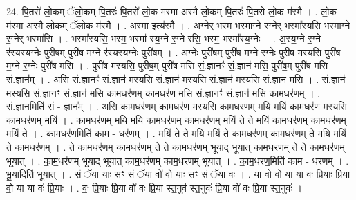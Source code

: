 \documentclass[17pt]{extarticle}
\begin{document}
24. पि॒तरो॑ लो॒कम् ॅलो॒कम् पि॒तरः॑ पि॒तरो॑ लो॒क म॑स्मा अस्मै लो॒कम् पि॒तरः॑ पि॒तरो॑ लो॒क म॑स्मै । . लो॒क म॑स्मा अस्मै लो॒कम् ॅलो॒क म॑स्मै । . अ॒स्मा॒ इत्य॑स्मै । . अ॒ग्नेर् भस्म॒ भस्मा॒ग्ने र॒ग्नेर् भस्मा᳚स्यसि॒ भस्मा॒ग्ने र॒ग्नेर् भस्मा॑सि । . भस्मा᳚स्यसि॒ भस्म॒ भस्मा᳚ स्य॒ग्ने र॒ग्ने र॑सि॒ भस्म॒ भस्मा᳚स्य॒ग्नेः । . अ॒स्य॒ग्ने र॒ग्ने र॑स्यस्य॒ग्नेः पुरी॑ष॒म् पुरी॑ष म॒ग्ने र॑स्यस्य॒ग्नेः पुरी॑षम् । . अ॒ग्नेः पुरी॑ष॒म् पुरी॑ष म॒ग्ने र॒ग्नेः पुरी॑ष मस्यसि॒ पुरी॑ष म॒ग्ने र॒ग्नेः पुरी॑ष मसि । . पुरी॑ष मस्यसि॒ पुरी॑ष॒म् पुरी॑ष मसि सं॒.ज्ञानꣳ॑ सं॒.ज्ञान॑ मसि॒ पुरी॑ष॒म् पुरी॑ष मसि सं॒.ज्ञान᳚म् । . अ॒सि॒ सं॒.ज्ञानꣳ॑ सं॒.ज्ञान॑ मस्यसि सं॒.ज्ञान॑ मस्यसि सं॒.ज्ञान॑ मस्यसि सं॒.ज्ञान॑ मसि । . सं॒.ज्ञान॑ मस्यसि सं॒.ज्ञानꣳ॑ सं॒.ज्ञान॑ मसि काम॒धर॑णम् काम॒धर॑ण मसि सं॒.ज्ञानꣳ॑ सं॒.ज्ञान॑ मसि काम॒धर॑णम् । . सं॒.ज्ञान॒मिति॑ सं - ज्ञान᳚म् । . अ॒सि॒ का॒म॒धर॑णम् काम॒धर॑ण मस्यसि काम॒धर॑ण॒म् मयि॒ मयि॑ काम॒धर॑ण मस्यसि काम॒धर॑ण॒म् मयि॑ । . का॒म॒धर॑ण॒म् मयि॒ मयि॑ काम॒धर॑णम् काम॒धर॑ण॒म् मयि॑ ते ते॒ मयि॑ काम॒धर॑णम् काम॒धर॑ण॒म् मयि॑ ते । . का॒म॒धर॑ण॒मिति॑ काम - धर॑णम् । . मयि॑ ते ते॒ मयि॒ मयि॑ ते काम॒धर॑णम् काम॒धर॑णम् ते॒ मयि॒ मयि॑ ते काम॒धर॑णम् । . ते॒ का॒म॒धर॑णम् काम॒धर॑णम् ते ते काम॒धर॑णम् भूयाद् भूयात् काम॒धर॑णम् ते ते काम॒धर॑णम् भूयात् । . का॒म॒धर॑णम् भूयाद् भूयात् काम॒धर॑णम् काम॒धर॑णम् भूयात् । . का॒म॒धर॑ण॒मिति॑ काम - धर॑णम् । . भू॒या॒दिति॑ भूयात् । . सं ॅया याः सꣳ सं ॅया वो॑ वो॒ याः सꣳ सं ॅया वः॑ । . या वो॑ वो॒ या या वः॑ प्रि॒याः प्रि॒या वो॒ या या वः॑ प्रि॒याः । . वः॒ प्रि॒याः प्रि॒या वो॑ वः प्रि॒या स्त॒नुव॑ स्त॒नुवः॑ प्रि॒या वो॑ वः प्रि॒या स्त॒नुवः॑ । \newline
\end{document}
